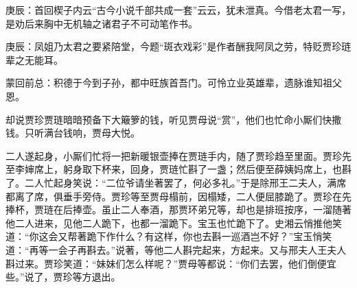 \begin{parag}
    \begin{note}庚辰：首回楔子内云“古今小说千部共成一套”云云，犹未泄真。今借老太君一写，是劝后来胸中无机轴之诸君子不可动笔作书。\end{note}
\end{parag}


\begin{parag}
    \begin{note}庚辰：凤姐乃太君之要紧陪堂，今题“斑衣戏彩”是作者酬我阿凤之劳，特贬贾珍琏辈之无能耳。\end{note}
\end{parag}


\begin{parag}
    \begin{note}蒙回前总：积德于今到子孙，都中旺族首吾门。可怜立业英雄辈，遗脉谁知祖父恩。\end{note}
\end{parag}


\begin{parag}
    却说贾珍贾琏暗暗预备下大簸箩的钱，听见贾母说“赏”，他们也忙命小厮们快撒钱。只听满台钱响，贾母大悦。
\end{parag}


\begin{parag}
    二人遂起身，小厮们忙将一把新暖银壶捧在贾琏手内，随了贾珍趋至里面。贾珍先至李婶席上，躬身取下杯来，回身，贾琏忙斟了一盏；然后便至薛姨妈席上，也斟了。二人忙起身笑说：“二位爷请坐著罢了，何必多礼。”于是除邢王二夫人，满席都离了席，俱垂手旁侍。贾珍等至贾母榻前，因榻矮，二人便屈膝跪了。贾珍在先捧杯，贾琏在后捧壶。虽止二人奉酒，那贾环弟兄等，却也是排班按序，一溜随著他二人进来，见他二人跪下，也都一溜跪下。宝玉也忙跪下了。史湘云悄推他笑道：“你这会又帮著跪下作什么？有这样，你也去斟一巡酒岂不好？”宝玉悄笑道：“再等一会子再斟去。”说著，等他二人斟完起来，方起来。又与邢夫人王夫人斟过来。贾珍笑道：“妹妹们怎么样呢？”贾母等都说：“你们去罢，他们倒便宜些。”说了，贾珍等方退出。
\end{parag}


